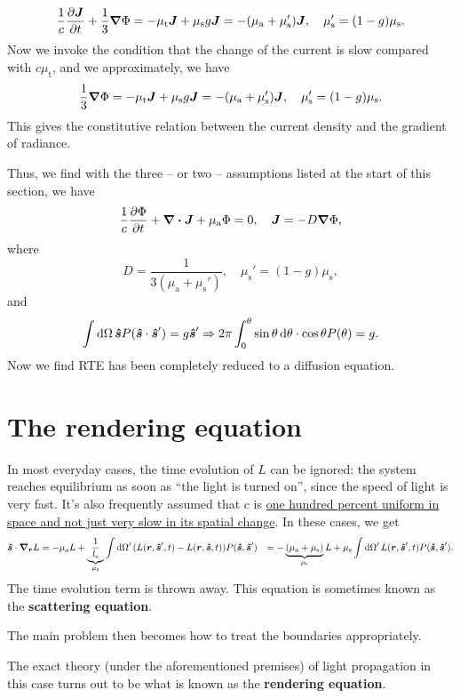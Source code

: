 \documentclass[hyperref, a4paper]{article}
\newcommand*{\concept}[1]{{\textbf{#1}}}
\def\\{}%
\begin{document}
\begin{equation}
    \frac{1}{c} \pdv{\vb*{J}}{t} + \frac{1}{3} \grad{\Phi}
    = - \mu_{\text{t}} \vb*{J} 
    + \mu_{\text{s}} g \vb*{J}
    = - (\mu_{\text{a}} + \mu_{\text{s}}') \vb*{J}, 
    \quad \mu_{\text{s}}' = (1 - g) \mu_{\text{s}}.
\end{equation}
Now we invoke the condition that the change of the current is slow 
compared with $c \mu_{\text{t}}$, 
and we approximately, we have 
\begin{equation}
    \frac{1}{3} \grad{\Phi}
    = - \mu_{\text{t}} \vb*{J} 
    + \mu_{\text{s}} g \vb*{J}
    = - (\mu_{\text{a}} + \mu_{\text{s}}') \vb*{J}, 
    \quad \mu_{\text{s}}' = (1 - g) \mu_{\text{s}}.
\end{equation}
This gives the constitutive relation between the current density 
and the gradient of radiance. 

Thus, we find with the three -- or two -- assumptions listed at the start of this section, 
we have 
\begin{equation}
    \frac{1}{c} \pdv{\Phi}{t} + \div{\vb*{J}} + \mu_{\text{a}} \Phi = 0, \quad 
    \vb*{J} = - D \grad{\Phi},
\end{equation}
where 
\begin{equation}
    D = \frac{1}{3 (\mu_{\text{a}} + \mu_{\text{s}}')}, \quad 
    \mu_{\text{s}}' = (1 - g) \mu_{\text{s}}, 
\end{equation}
and 
\begin{equation}
    \int \dd{\Omega} \vu*{s} P(\vu*{s} \cdot \vu*{s}') = g \vu*{s}'
    \Rightarrow 2 \pi \int_{0}^{\theta} \sin \theta \dd{\theta} \cdot \cos \theta P(\theta)
    = g .
\end{equation}
Now we find RTE has been completely reduced to a diffusion equation.

\section{The rendering equation}

In most everyday cases, the time evolution of $L$ can be ignored: 
the system reaches equilibrium as soon as ``the light is turned on'', 
since the speed of light is very fast. 
It's also frequently assumed that $c$ is 
\ul{one hundred percent uniform in space
and not just very slow in its spatial change}. 
In these cases, we get 
\begin{equation}
    \begin{aligned}
        \vu*{s} \cdot \grad_{\vb*{r}} L &= 
        - \mu_{\text{a}} L +
        \underbrace{\frac{1}{l_{\text{s}}}}_{\mu_{\text{s}}} \int \dd{\Omega'} 
        (L(\vb*{r}, \vu*{s}', t) - L(\vb*{r}, \vu*{s}, t)) P(\vu*{s}, \vu*{s}') \\
        &= - \underbrace{(\mu_{\text{a}} + \mu_{\text{s}})}_{\mu_{\text{t}}} L 
        + \mu_{\text{s}} \int \dd{\Omega'} 
        L(\vb*{r}, \vu*{s}', t) P(\vu*{s}, \vu*{s}') .
    \end{aligned}
    \label{eq:se-final}
\end{equation}
The time evolution term is thrown away. 
This equation is sometimes known as the \concept{scattering equation}.

The main problem then becomes how to treat the boundaries appropriately.

The exact theory (under the aforementioned premises) of light propagation 
in this case turns out to be what is known as the \concept{rendering equation}. 
\end{document}
